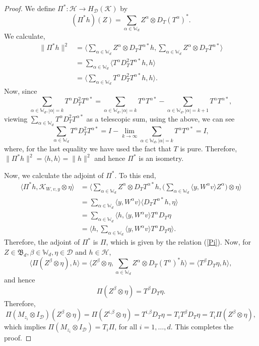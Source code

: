 \documentclass[12pt]{amsart}%
\numberwithin{equation}{section}
\newcommand{\bW}{\mathbb{W}}
\newcommand{\fB}{{\mathfrak{B}}}
\newcommand{\cld}{\mathcal{D}}
\newcommand{\clh}{\mathcal{H}}
\newcommand{\clk}{\mathcal{K}}
\newcommand\la{{\langle }}
\newcommand\ra{{\rangle}}
\begin{document}
\begin{proof}
We define $\Pi^*:\clh\to H_{\cld}(\clk)$ by
\[
(\Pi^*h)(Z)=\sum_{\alpha\in\bW_d}Z^{\alpha}\otimes D_T(T^{\alpha})^*.
\]
We calculate,
\begin{align*}
\|\Pi^*h\|^2
&=\Big\langle \sum_{\alpha\in \bW_d} Z^{\alpha}\otimes D_TT^{\alpha*}h, \sum_{\alpha\in \bW_d} Z^{\alpha}\otimes D_TT^{\alpha*}\Big\rangle\\
&= \sum_{\alpha\in \bW_d}\la T^{\alpha}D_T^2T^{\alpha*}h,h\ra\\
&= \Big\langle \sum_{\alpha\in \bW_d} T^{\alpha}D_T^2T^{\alpha*}h,h \Big\rangle.
\end{align*}
Now, since
\[
\sum_{\alpha\in \bW_d, |\alpha|=k} T^{\alpha}D_T^2T^{\alpha*}=\sum_{\alpha\in \bW_d, |\alpha|=k} T^{\alpha}T^{\alpha*}-\sum_{\alpha\in \bW_d, |\alpha|=k+1} T^{\alpha}T^{\alpha*},
\]
viewing $\sum_{\alpha\in \bW_d} T^{\alpha}D_T^2T^{\alpha*}$ as a telescopic sum, using the above, we can see
\begin{equation}\label{identity}
\sum_{\alpha\in \bW_d} T^{\alpha}D_T^2T^{\alpha*}= I-\lim_{k\to \infty}\sum_{\alpha\in \bW_d, |\alpha|=k} T^{\alpha}T^{\alpha*}=I,
\end{equation}
where, for the last equality we have used the fact that $T$ is pure. Therefore,
$\|\Pi^*h\|^2=\la h,h\ra=\|h\|^2$ and hence $\Pi^*$ is an isometry.

Now, we calculate the adjoint of $\Pi^*$. To this end,
\begin{align*}
\la \Pi^*h, \clk_{W,v,y}\otimes\eta\ra&=\Big\langle \sum_{\alpha\in \bW_d} Z^{\alpha}\otimes D_TT^{\alpha*}h, \Big (\sum_{\alpha\in \bW_d} \la y, W^\alpha v\ra Z^\alpha \Big )\otimes \eta \Big\rangle \\
&=\sum_{\alpha\in \bW_d}\la y, W^\alpha v \ra \la D_TT^{\alpha*}h, \eta\ra\\
&=\sum_{\alpha\in \bW_d} \big\langle h, \la y, W^\alpha v \ra T^{\alpha} D_T\eta\\
&= \Big\langle h, \sum_{\alpha\in \bW_d} \la y, W^\alpha v \ra T^{\alpha} D_T\eta
\Big\rangle. 
\end{align*}
Therefore, the adjoint of $\Pi^*$ is $\Pi$, which is given by the relation (\ref{Pi}). Now, for $Z\in\fB_d,\beta\in\bW_d,\eta\in\cld$ and $h\in\clh$,
\[
\la \Pi (Z^{\beta}\otimes \eta), h \ra=\Big\langle Z^{\beta}\otimes \eta, \sum_{\alpha\in\bW_d}Z^{\alpha}\otimes D_T(T^{\alpha})^*h  \Big\rangle= \la T^{\beta} D_T\eta, h\ra,
\]
and hence
\[
\Pi (Z^{\beta}\otimes \eta)=T^{\beta} D_T\eta.
\]
Therefore,
\begin{equation}\label{dilation_intertwiner}
\Pi (M_{z_i}\otimes I_{\cld})(Z^{\beta}\otimes \eta)=\Pi (Z^{i.\beta}\otimes \eta)= T^{i.\beta} D_T\eta=T_i T^{\beta} D_T\eta=T_i\Pi(Z^{\beta}\otimes \eta),
\end{equation}
which implies $\Pi (M_{z_i}\otimes I_{\cld})= T_i\Pi$, for all $i=1,\ldots,d$. This completes the proof.
\end{proof}
\end{document}
